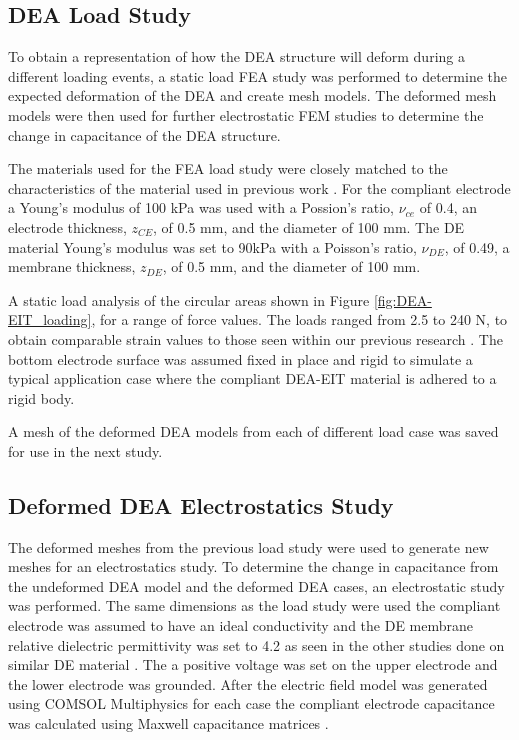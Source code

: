 \subsection{DEA Load Study}
To obtain a representation of how the DEA structure will deform during a different loading events, a static load FEA study was performed to determine the expected deformation of the DEA and create mesh models. The deformed mesh models were then used for further electrostatic FEM studies to determine the change in capacitance of the DEA structure.

The materials used for the FEA load study were closely matched to the characteristics of the material used in previous work \cite{Ellingham2024} . For the compliant electrode a Young's modulus of 100 kPa was used with a Possion's ratio, $\nu_{ce}$ of 0.4, an electrode thickness, $z_{CE}$, of 0.5 mm, and the diameter of 100 mm. The DE material Young's modulus was set to 90kPa with a Poisson's ratio, $\nu_{DE}$, of 0.49, a membrane thickness, $z_{DE}$, of 0.5 mm, and the diameter of 100 mm. 

A static load analysis of the circular areas shown in Figure \ref{fig:DEA-EIT_loading}, for a range of force values. The loads ranged from 2.5 to 240 N, to obtain comparable strain values to those seen within our previous research \cite{Ellingham2021,Ellingham2024} . The bottom electrode surface was assumed fixed in place and rigid to simulate a typical application case where the compliant DEA-EIT material is adhered to a rigid body.

A mesh of the deformed DEA models from each of different load case was saved for use in the next study.


\subsection{Deformed DEA Electrostatics Study}
The deformed meshes from the previous load study were used to generate new meshes for an electrostatics study. To determine the change in capacitance from the undeformed DEA model and the deformed DEA cases, an electrostatic study was performed. The same dimensions as the load study were used the compliant electrode was assumed to have an ideal conductivity and the DE membrane relative dielectric permittivity was set to 4.2 as seen in the other studies done on similar DE material \cite{Pan2015}. The a positive voltage was set on the upper electrode and the lower electrode was grounded. After the electric field model was generated using COMSOL Multiphysics \cite{COMSOL2022} for each case the compliant electrode capacitance was calculated using Maxwell capacitance matrices \cite{Smolic2021} . 


